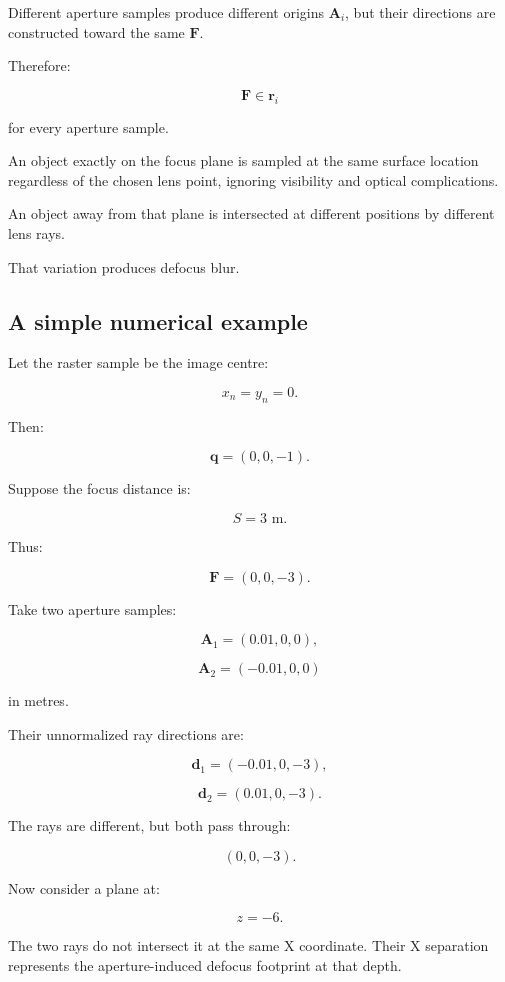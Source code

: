 Different aperture samples produce different origins \(\mathbf A_i\), but their directions are constructed toward the same \(\mathbf F\).

Therefore:

\[ \boxed{ \mathbf F \in\mathbf r_i } \]

for every aperture sample.

An object exactly on the focus plane is sampled at the same surface location regardless of the chosen lens point, ignoring visibility and optical complications.

An object away from that plane is intersected at different positions by different lens rays.

That variation produces defocus blur.

\subsection{A simple numerical example}\label{02-foundations-ii-ch036-a-simple-numerical-example}

\hypertarget{02-foundations-ii-ch036-a-simple-numerical-example}{}

Let the raster sample be the image centre:

\[ x_n=y_n=0. \]

Then:

\[ \mathbf q=(0,0,-1). \]

Suppose the focus distance is:

\[ S=3\text{ m}. \]

Thus:

\[ \boxed{ \mathbf F=(0,0,-3). } \]

Take two aperture samples:

\[ \mathbf A_1=(0.01,0,0), \]

\[ \mathbf A_2=(-0.01,0,0) \]

in metres.

Their unnormalized ray directions are:

\[ \mathbf d_1=(-0.01,0,-3), \]

\[ \mathbf d_2=(0.01,0,-3). \]

The rays are different, but both pass through:

\[ (0,0,-3). \]

Now consider a plane at:

\[ z=-6. \]

The two rays do not intersect it at the same X coordinate. Their X separation represents the aperture-induced defocus footprint at that depth.


